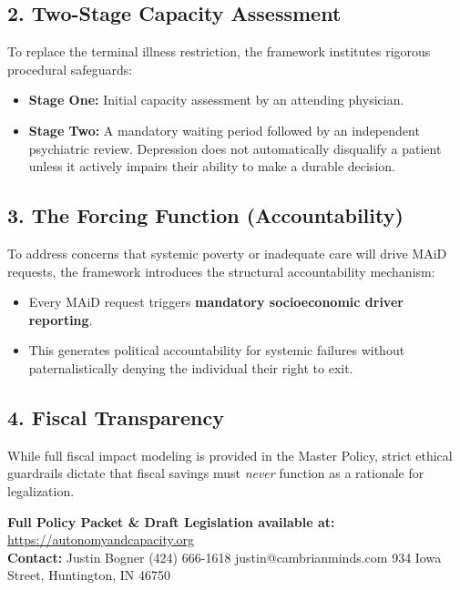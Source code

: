 \documentclass[11pt]{article}
\begin{document}
\subsection*{2. Two-Stage Capacity Assessment}
To replace the terminal illness restriction, the framework institutes rigorous procedural safeguards:
\begin{itemize}
    \item \textbf{Stage One:} Initial capacity assessment by an attending physician.
    \item \textbf{Stage Two:} A mandatory waiting period followed by an independent psychiatric review. Depression does not automatically disqualify a patient unless it actively impairs their ability to make a durable decision.
\end{itemize}

\subsection*{3. The Forcing Function (Accountability)}
To address concerns that systemic poverty or inadequate care will drive MAiD requests, the framework introduces the structural accountability mechanism:
\begin{itemize}
    \item Every MAiD request triggers \textbf{mandatory socioeconomic driver reporting}.
    \item This generates political accountability for systemic failures without paternalistically denying the individual their right to exit.
\end{itemize}

\subsection*{4. Fiscal Transparency}
While full fiscal impact modeling is provided in the Master Policy, strict ethical guardrails dictate that fiscal savings must \textit{never} function as a rationale for legalization.

\vspace{1em}
\noindent \textbf{Full Policy Packet \& Draft Legislation available at:} \url{https://autonomyandcapacity.org} \\
\noindent \textbf{Contact:} Justin Bogner \textbar{} (424) 666-1618 \textbar{} justin@cambrianminds.com \textbar{} 934 Iowa Street, Huntington, IN 46750
\end{document}
